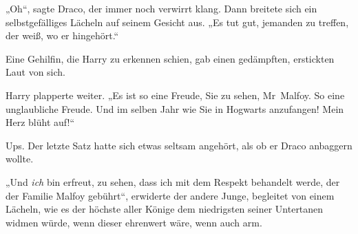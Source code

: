 „Oh“, sagte Draco, der immer noch verwirrt klang. Dann breitete sich ein selbstgefälliges Lächeln auf seinem Gesicht aus.
„Es tut gut, jemanden zu treffen, der weiß, wo er hingehört.“

Eine Gehilfin, die Harry zu erkennen schien, gab einen gedämpften, erstickten Laut von sich.

Harry plapperte weiter.
„Es ist so eine Freude, Sie zu sehen, Mr~Malfoy. So eine unglaubliche Freude. Und im selben Jahr wie Sie in Hogwarts anzufangen! Mein Herz blüht auf!“

Ups. Der letzte Satz hatte sich etwas seltsam angehört, als ob er Draco anbaggern wollte.

„Und \emph{ich} bin erfreut, zu sehen, dass ich mit dem Respekt behandelt werde, der der Familie Malfoy gebührt“, erwiderte der andere Junge, begleitet von einem Lächeln, wie es der höchste aller Könige dem niedrigsten seiner Untertanen widmen würde, wenn dieser ehrenwert wäre, wenn auch arm.

